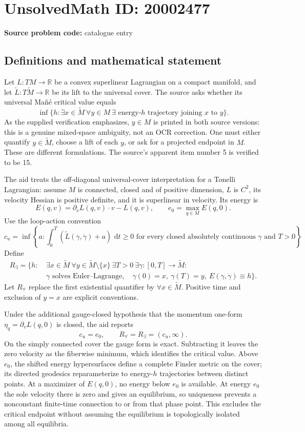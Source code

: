 \documentclass[11pt]{article}
\newcommand{\R}{\mathbb{R}}
\newcommand{\dd}{\,\mathrm{d}}
\begin{document}
\section*{UnsolvedMath ID: 20002477}
\textbf{Source problem code:} catalogue entry
\subsection{Definitions and mathematical statement}
Let $L:TM\to\R$ be a convex superlinear Lagrangian on a compact manifold, and let $\widetilde L:T\widetilde M\to\R$ be its lift to the universal cover. The source asks whether its universal Ma\~n\'e critical value equals
\[
 \inf\{h:\exists x\in\widetilde M\ \forall y\in M\
   \exists\text{ energy-}h\text{ trajectory joining }x\text{ to }y\}.
\]
As the supplied verification emphasizes, $y\in M$ is printed in both source versions: this is a genuine mixed-space ambiguity, not an OCR correction. One must either quantify $y\in\widetilde M$, choose a lift of each $y$, or ask for a projected endpoint in $M$. These are different formulations. The source's apparent item number 5 is verified to be 15.

The aid treats the off-diagonal universal-cover interpretation for a Tonelli Lagrangian: assume $M$ is connected, closed and of positive dimension, $L$ is $C^2$, its velocity Hessian is positive definite, and it is superlinear in velocity. Its energy is
\[
 E(q,v)=\partial_vL(q,v)\cdot v-L(q,v),\qquad
 e_0=\max_{q\in M}E(q,0).
\]
Use the loop-action convention
\[
 c_u=\inf\left\{a:\int_0^T(\widetilde L(\gamma,\dot\gamma)+a)\,\dd t\ge0
 \text{ for every closed absolutely continuous }\gamma\text{ and }T>0\right\}.
\]
Define
\[
\begin{split}
 R_{\exists}=\{h:\ &\exists x\in\widetilde M\ \forall y\in\widetilde M\setminus\{x\}\
 \exists T>0\ \exists\gamma:[0,T]\to\widetilde M:\\
 &\gamma\text{ solves Euler--Lagrange},\quad
 \gamma(0)=x,\ \gamma(T)=y,\ E(\gamma,\dot\gamma)\equiv h\}.
\end{split}
\]
Let $R_{\forall}$ replace the first existential quantifier by $\forall x\in\widetilde M$. Positive time and exclusion of $y=x$ are explicit conventions.

Under the additional gauge-closed hypothesis that the momentum one-form $\eta_q=\partial_vL(q,0)$ is closed, the aid reports
\[
 c_u=e_0,\qquad R_{\forall}=R_{\exists}=(c_u,\infty).
\]
On the simply connected cover the gauge form is exact. Subtracting it leaves the zero velocity as the fiberwise minimum, which identifies the critical value. Above $e_0$, the shifted energy hypersurfaces define a complete Finsler metric on the cover; its directed geodesics reparameterize to energy-$h$ trajectories between distinct points. At a maximizer of $E(q,0)$, no energy below $e_0$ is available. At energy $e_0$ the sole velocity there is zero and gives an equilibrium, so uniqueness prevents a nonconstant finite-time connection to or from that phase point. This excludes the critical endpoint without assuming the equilibrium is topologically isolated among all equilibria.
\end{document}
